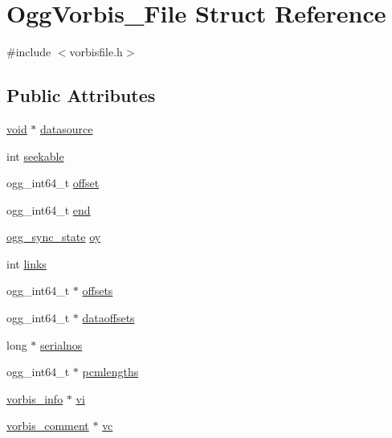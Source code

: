 \hypertarget{struct_ogg_vorbis___file}{}\section{Ogg\+Vorbis\+\_\+\+File Struct Reference}
\label{struct_ogg_vorbis___file}


{\ttfamily \#include $<$vorbisfile.\+h$>$}

\subsection*{Public Attributes}
\begin{DoxyCompactItemize}
\item 
\hyperlink{_s_d_l__opengles2__gl2ext_8h_ae5d8fa23ad07c48bb609509eae494c95}{void} $\ast$ \hyperlink{struct_ogg_vorbis___file_a46afb3dcc7aac5917573e41d7504c0d6}{datasource}
\item 
int \hyperlink{struct_ogg_vorbis___file_a2a390c4f15c0d1fe0cf9c90fd0bae087}{seekable}
\item 
ogg\+\_\+int64\+\_\+t \hyperlink{struct_ogg_vorbis___file_a36f8f9f012cd2e7ab8cb395b787376cb}{offset}
\item 
ogg\+\_\+int64\+\_\+t \hyperlink{struct_ogg_vorbis___file_ae56eb8bc78d2fc27c79d145a7c80a681}{end}
\item 
\hyperlink{structogg__sync__state}{ogg\+\_\+sync\+\_\+state} \hyperlink{struct_ogg_vorbis___file_ae35fa1e6f99edcb104566301324ecf94}{oy}
\item 
int \hyperlink{struct_ogg_vorbis___file_ad41f80ffaa6b48a14addef0a02639a87}{links}
\item 
ogg\+\_\+int64\+\_\+t $\ast$ \hyperlink{struct_ogg_vorbis___file_af9fe0ece4ff98e207682731b36951920}{offsets}
\item 
ogg\+\_\+int64\+\_\+t $\ast$ \hyperlink{struct_ogg_vorbis___file_af797824fb6e98c0248c19e6909dd680e}{dataoffsets}
\item 
long $\ast$ \hyperlink{struct_ogg_vorbis___file_abd5a9adc78abd620ce2c63bd153df150}{serialnos}
\item 
ogg\+\_\+int64\+\_\+t $\ast$ \hyperlink{struct_ogg_vorbis___file_a88a4e6a4ec6c9837d44e6cc0c864679e}{pcmlengths}
\item 
\hyperlink{structvorbis__info}{vorbis\+\_\+info} $\ast$ \hyperlink{struct_ogg_vorbis___file_aa5586b939d7c31c8eec83cf1380b45a6}{vi}
\item 
\hyperlink{structvorbis__comment}{vorbis\+\_\+comment} $\ast$ \hyperlink{struct_ogg_vorbis___file_a4467850c72aed93fe0a70e8f1fd6f20e}{vc}

\end{DoxyCompactItemize}
